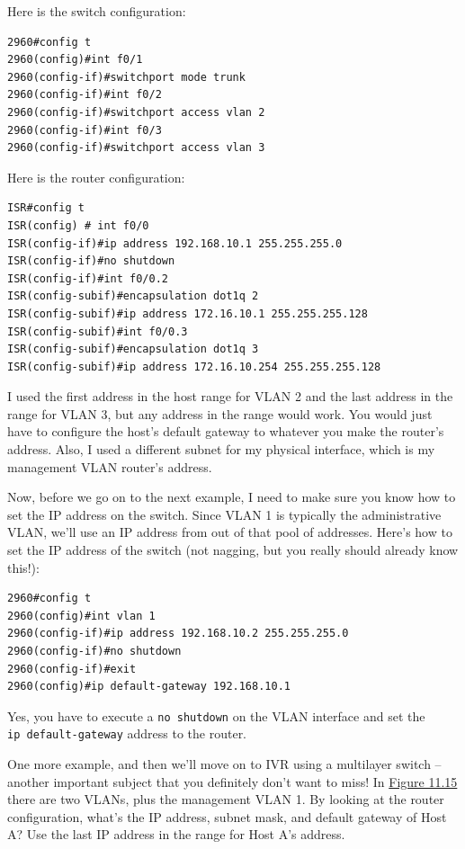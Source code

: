 \documentclass[b5paper,11pt]{memoir}
\begin{document}
Here is the switch configuration:

\begin{verbatim}
2960#config t
2960(config)#int f0/1
2960(config-if)#switchport mode trunk
2960(config-if)#int f0/2
2960(config-if)#switchport access vlan 2
2960(config-if)#int f0/3
2960(config-if)#switchport access vlan 3
\end{verbatim}

Here is the router configuration:

\begin{verbatim}
ISR#config t
ISR(config) # int f0/0
ISR(config-if)#ip address 192.168.10.1 255.255.255.0
ISR(config-if)#no shutdown
ISR(config-if)#int f0/0.2
ISR(config-subif)#encapsulation dot1q 2
ISR(config-subif)#ip address 172.16.10.1 255.255.255.128
ISR(config-subif)#int f0/0.3
ISR(config-subif)#encapsulation dot1q 3
ISR(config-subif)#ip address 172.16.10.254 255.255.255.128
\end{verbatim}

I used the first address in the host range for VLAN 2 and the last
address in the range for VLAN 3, but any address in the range would
work. You would just have to configure the host's default gateway to
whatever you make the router's address. Also, I used a different subnet
for my physical interface, which is my management VLAN router's address.

Now, before we go on to the next example, I need to make sure you know
how to set the IP address on the switch. Since VLAN 1 is typically the
administrative VLAN, we'll use an IP address from out of that pool of
addresses. Here's how to set the IP address of the switch (not nagging,
but you really should already know this!):

\begin{verbatim}
2960#config t
2960(config)#int vlan 1
2960(config-if)#ip address 192.168.10.2 255.255.255.0
2960(config-if)#no shutdown
2960(config-if)#exit
2960(config)#ip default-gateway 192.168.10.1
\end{verbatim}

Yes, you have to execute a \texttt{no\ shutdown} on the VLAN interface
and set the \texttt{ip\ default-gateway} address to the router.

One more example, and then we'll move on to IVR using a multilayer
switch -- another important subject that you definitely don't want to
miss! In \protect\hyperlink{c11.xhtmlux5cux23figure11-15}{Figure 11.15}
there are two VLANs, plus the management VLAN 1. By looking at the
router configuration, what's the IP address, subnet mask, and default
gateway of Host A? Use the last IP address in the range for Host A's
address.
\end{document}
